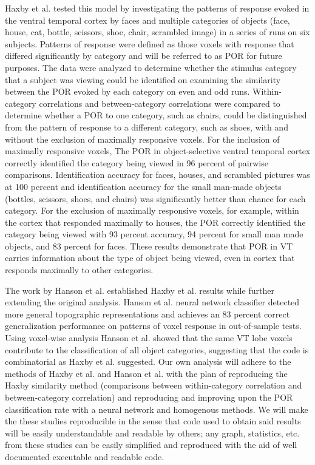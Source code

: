 \documentclass[12pt]{article}
\begin{document}
Haxby et al. tested this model by investigating the patterns of response evoked 
in the ventral temporal cortex by faces and multiple categories of objects 
(face, house, cat, bottle, scissors, shoe, chair, scrambled image) in a series 
of runs on six subjects. Patterns of response were defined as those voxels with 
response that differed significantly by category and will be referred to as POR 
for future purposes. The data \cite{haxby2001vor} were analyzed to determine 
whether the stimulus category that a subject was viewing could be identified on 
examining the similarity between the POR evoked by each category on even and 
odd runs. Within-category correlations and between-category correlations were 
compared to determine whether a POR to one category, such as chairs, could be 
distinguished from the pattern of response to a different category, such as 
shoes, with and without the exclusion of maximally responsive voxels. For the 
inclusion of maximally responsive voxels, The POR in object-selective ventral 
temporal cortex correctly identified the category being viewed in 96 percent of 
pairwise comparisons. Identification accuracy for faces, houses, and scrambled 
pictures was at 100 percent and identification accuracy for the small man-made 
objects (bottles, scissors, shoes, and chairs) was significantly better than 
chance for each category. For the exclusion of maximally responsive voxels, for 
example, within the cortex that responded maximally to houses, the POR 
correctly identified the category being viewed with 93 percent accuracy, 94 
percent for small man made objects, and 83 percent for faces.  These results 
demonstrate that POR in VT carries information about the type of object being 
viewed, even in cortex that responds maximally to other categories.

The work by Hanson et al. established Haxby et al. results while further 
extending the original analysis.  Hanson et al. neural network classifier 
detected more general topographic representations and achieves an 83 percent 
correct generalization performance on patterns of voxel response in 
out-of-sample tests.  Using voxel-wise analysis Hanson et al. showed that the 
same VT lobe voxels contribute to the classification of all object categories, 
suggesting that the code is combinatorial as Haxby et al. suggested. Our own 
analysis will adhere to the methods of Haxby et al. and Hanson et al. with the 
plan of reproducing the Haxby similarity method (comparisons between 
within-category correlation and between-category correlation) and reproducing 
and improving upon the POR classification rate with a neural network and 
homogenous methods. We will make the these studies reproducible in the sense 
that code used to obtain said results will be easily understandable and 
readable by others; any graph, statistics, etc. from these studies can be 
easily simplified and reproduced with the aid of well documented executable and 
readable code.
\end{document}
